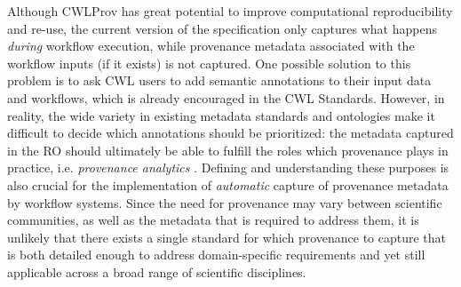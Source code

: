 Although CWLProv has great potential to improve computational reproducibility and re-use, the current version of the specification only captures what happens \emph{during} workflow execution, while provenance metadata associated with the workflow inputs (if it exists) is not captured. 
One possible solution to this problem is to ask CWL users to add semantic annotations to their input data and workflows, which is already encouraged in the CWL Standards.
However, in reality, the wide variety in existing metadata standards and ontologies
make it difficult to decide which annotations should be prioritized: the metadata captured in the RO should ultimately be able to fulfill the roles which provenance plays in practice, i.e. \emph{provenance analytics} \cite{missierLifecycleProvenanceMetadata2016}. 
Defining and understanding these purposes is also crucial for the implementation of \emph{automatic} capture of provenance metadata by workflow systems. 
Since the need for provenance may vary between scientific communities, as well as the metadata that is required to address them, it is unlikely that there exists a single standard for which provenance to capture that is both detailed enough to address domain-specific requirements and yet still applicable across a broad range of scientific disciplines. %





